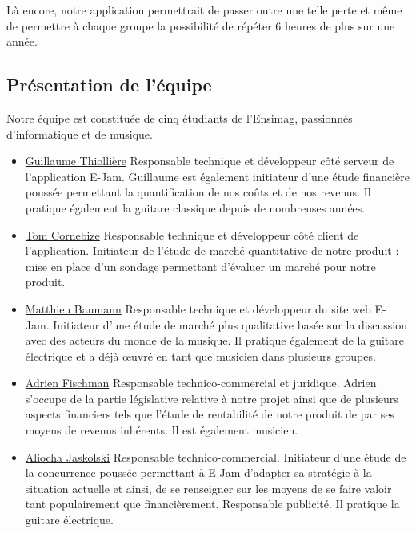 \documentclass[a4,12pt]{article}
\begin{document}
Là encore, notre application permettrait de passer outre une telle perte et même de
permettre à chaque groupe la possibilité de répéter 6 heures de plus sur une année.

\subsection{Présentation de l'équipe}

Notre équipe est constituée de cinq étudiants de l'Ensimag, passionnés d'informatique
et de musique.

\begin{itemize}
\item \underline{Guillaume Thiollière}
Responsable technique et développeur côté
serveur de l'application E-Jam. Guillaume est également initiateur
d'une étude financière poussée permettant la quantification de nos
coûts et de nos revenus. Il pratique également la guitare classique
depuis de nombreuses années.

\item \underline{Tom Cornebize}
Responsable technique et développeur côté client
de l'application. Initiateur de l'étude de marché quantitative de notre
produit : mise en place d'un sondage permettant d'évaluer un marché
pour notre produit.

\item \underline{Matthieu Baumann}
Responsable technique et développeur du site
web E-Jam. Initiateur d'une étude de marché plus qualitative basée sur la
discussion avec des acteurs du monde de la musique. Il pratique
également de la guitare électrique et a déjà œuvré en tant que musicien
dans plusieurs groupes.

\item \underline{Adrien Fischman}
Responsable technico-commercial et juridique.
Adrien s'occupe de la partie législative relative à notre projet ainsi que
de plusieurs aspects financiers tels que l'étude de rentabilité de notre
produit de par ses moyens de revenus inhérents. Il est également
musicien.

\item \underline{Aliocha Jaskolski}
Responsable technico-commercial. Initiateur d'une
étude de la concurrence poussée permettant à E-Jam d'adapter sa stratégie
à la situation actuelle et ainsi, de se renseigner sur les moyens de se faire
valoir tant populairement que financièrement. Responsable publicité. Il
pratique la guitare électrique.

\end{itemize}
\end{document}

